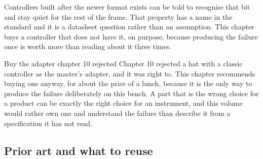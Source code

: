 Controllers built after the newer format exists can be told to recognise that
bit and stay quiet for the rest of the frame. That property has a name in the
standard and it is a datasheet question rather than an assumption. This chapter
buys a controller that does not have it, on purpose, because producing the
failure once is worth more than reading about it three times.

\begin{note}{Buy the adapter chapter 10 rejected}
Chapter 10 rejected a hat with a classic controller as the master's adapter, and
it was right to. This chapter recommends buying one anyway, for about the price
of a lunch, because it is the only way to produce the failure deliberately on
this bench. A part that is the wrong choice for a product can be exactly the
right choice for an instrument, and this volume would rather own one and
understand the failure than describe it from a specification it has not read.
\end{note}

\subsection*{Prior art and what to reuse}

